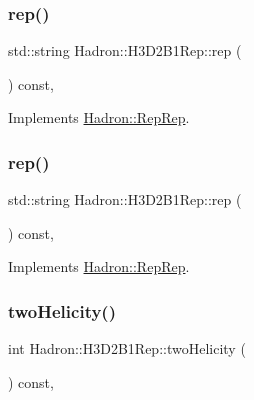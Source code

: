 \subsubsection{\texorpdfstring{rep()}{rep()}\hspace{0.1cm}{\footnotesize\ttfamily [2/3]}}
{\footnotesize\ttfamily std\+::string Hadron\+::\+H3\+D2\+B1\+Rep\+::rep (\begin{DoxyParamCaption}{ }\end{DoxyParamCaption}) const\hspace{0.3cm}{\ttfamily [inline]}, {\ttfamily [virtual]}}



Implements \mbox{\hyperlink{structHadron_1_1RepRep_ab3213025f6de249f7095892109575fde}{Hadron\+::\+Rep\+Rep}}.

\mbox{\label{structHadron_1_1H3D2B1Rep_a43cf9c155f37ec6e0fa26166cd1a5f2a}} 
\subsubsection{\texorpdfstring{rep()}{rep()}\hspace{0.1cm}{\footnotesize\ttfamily [3/3]}}
{\footnotesize\ttfamily std\+::string Hadron\+::\+H3\+D2\+B1\+Rep\+::rep (\begin{DoxyParamCaption}{ }\end{DoxyParamCaption}) const\hspace{0.3cm}{\ttfamily [inline]}, {\ttfamily [virtual]}}



Implements \mbox{\hyperlink{structHadron_1_1RepRep_ab3213025f6de249f7095892109575fde}{Hadron\+::\+Rep\+Rep}}.

\mbox{\label{structHadron_1_1H3D2B1Rep_aac44e59a958d39120aa886dafe262b7d}} 
\subsubsection{\texorpdfstring{twoHelicity()}{twoHelicity()}\hspace{0.1cm}{\footnotesize\ttfamily [1/2]}}
{\footnotesize\ttfamily int Hadron\+::\+H3\+D2\+B1\+Rep\+::two\+Helicity (\begin{DoxyParamCaption}{ }\end{DoxyParamCaption}) const\hspace{0.3cm}{\ttfamily [inline]}, {\ttfamily [virtual]}}

